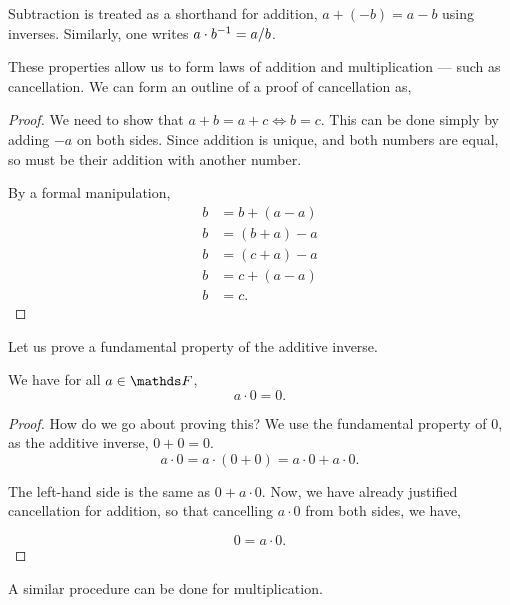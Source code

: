 Subtraction is treated as a shorthand for addition, \(a + (-b) = a - b\) using 
inverses. Similarly, one writes \(a \cdot b\inv = a/b\).

These properties allow us to form laws of addition and multiplication --- such as 
cancellation. We can form an outline of a proof of cancellation as, 

\begin{proof}
    We need to show that \(a + b = a + c \iff b = c\). 
    This can be done simply by adding \(-a\) on both sides. Since addition is unique, 
    and both numbers are equal, so must be their addition with another number. 
    
    By a formal manipulation,
    \begin{align*}
        b &= b + (a - a) \\
        b &= (b + a) - a \\
        b &= (c + a) - a \\
        b &= c + (a - a)\\
        b &= c.
    \end{align*}
\end{proof}

Let us prove a fundamental property of the additive inverse.

\begin{proposition}
    We have for all \(a \in \FF\), 
    \begin{equation*}
        a \cdot 0 = 0.
    \end{equation*}
\end{proposition}

\begin{proof}
    How do we go about proving this? We use the fundamental property of \(0\), as 
    the additive inverse, \(0 + 0 = 0\).
    \begin{equation*}
        a \cdot 0 = a \cdot (0 + 0) = a \cdot 0 + a \cdot 0.
    \end{equation*}

    The left-hand side is the same as \(0 + a \cdot 0\). Now, we have already justified 
    cancellation for addition, so that cancelling \(a \cdot 0\) from both sides, we have, 

    \begin{equation*}
        0 = a\cdot 0.
    \end{equation*}
\end{proof}

A similar procedure can be done for multiplication.

